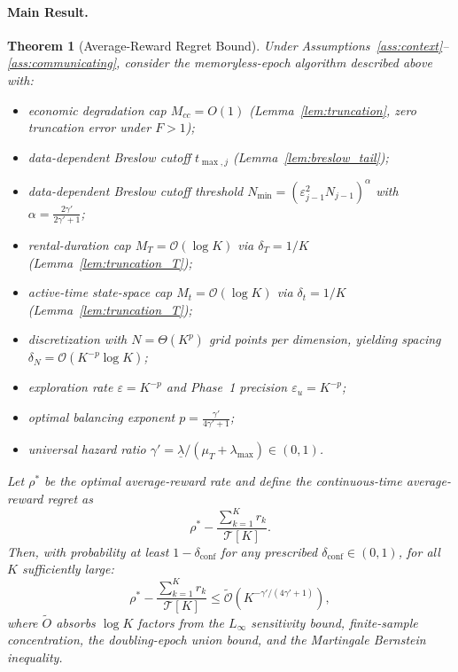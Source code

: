 \documentclass[letterpaper, 10 pt, conference]{IEEEconf}
\newtheorem{theorem}{Theorem}
\begin{document}
\paragraph{Main Result.}

\begin{theorem}[Average-Reward Regret Bound]
    \label{thm:main}
    Under Assumptions~\ref{ass:context}--\ref{ass:communicating}, consider the memoryless-epoch algorithm described above with:
    \begin{itemize}
        \item economic degradation cap $M_{cc} = O(1)$ (Lemma~\ref{lem:truncation}, zero truncation error under $F > 1$);
        \item data-dependent Breslow cutoff $t_{\max,j}$ (Lemma~\ref{lem:breslow_tail});
        \item data-dependent Breslow cutoff threshold $N_{\min} = (\varepsilon_{j-1}^2 N_{j-1})^\alpha$ with $\alpha = \frac{2\gamma'}{2\gamma'+1}$;
        \item rental-duration cap $M_T = \mathcal{O}(\log K)$ via $\delta_T = 1/K$ (Lemma~\ref{lem:truncation_T});
        \item active-time state-space cap $M_t = \mathcal{O}(\log K)$ via $\delta_t = 1/K$ (Lemma~\ref{lem:truncation_T});
        \item discretization with $N = \Theta(K^{p})$ grid points per dimension, yielding spacing $\delta_N = \mathcal{O}(K^{-p} \log K)$;
        \item exploration rate $\varepsilon = K^{-p}$ and Phase~1 precision $\varepsilon_u = K^{-p}$;
        \item optimal balancing exponent $p = \frac{\gamma'}{4\gamma'+1}$;
        \item universal hazard ratio $\gamma' = \underline{\lambda} / (\mu_T + \lambda_{\max}) \in (0, 1)$.
    \end{itemize}
    Let $\rho^*$ be the optimal average-reward rate and define the continuous-time average-reward regret as
    \begin{equation}
        \label{eq:avg_regret_def}
        \rho^* - \frac{\sum_{k=1}^K r_k}{\mathcal{T}[K]}.
    \end{equation}
    Then, with probability at least $1 - \delta_{\mathrm{conf}}$ for any prescribed $\delta_{\mathrm{conf}} \in (0,1)$, for all $K$ sufficiently large:
    \begin{equation}
        \label{eq:main_rate}
        \rho^* - \frac{\sum_{k=1}^K r_k}{\mathcal{T}[K]} \leq \widetilde{\mathcal{O}}(K^{-\gamma'/(4\gamma'+1)}),
    \end{equation}
    where $\widetilde{O}$ absorbs $\log K$ factors from the $L_\infty$ sensitivity bound, finite-sample concentration, the doubling-epoch union bound, and the Martingale Bernstein inequality.
\end{theorem}
\end{document}
